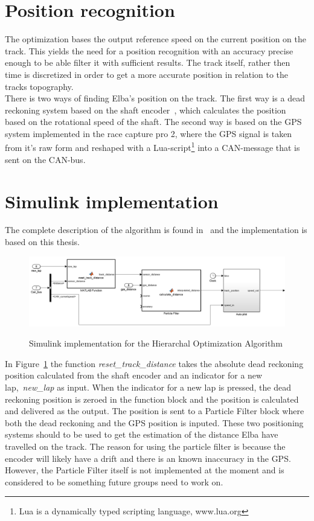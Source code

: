 \section{Position recognition}\label{sec:opt_pos_recon}
The optimization bases the output reference speed on the current position on the
track. This yields the need for a position recognition with an accuracy precise
enough to be able filter it with sufficient results. The track itself, rather
then time is discretized in order to get a more accurate position in relation to
the tracks topography. \\
There is two ways of finding Elba's position on the track. The first way is a dead
reckoning system based on the shaft encoder~\cite[p.~49]{elba2015},
which calculates the position based on the rotational speed of the shaft. The
second way is based on the GPS system implemented in the race capture pro 2,
where the GPS signal is taken from it's raw form and reshaped with a
Lua-script\footnote{Lua is a dynamically typed scripting language, www.lua.org}
into a CAN-message that is sent on the CAN-bus.

\section{Simulink implementation}
The complete description of the algorithm is found in~\cite{liu2016} and the
implementation is based on this thesis.
\begin{figure}[H]
    \centering\label{fig:optimization_cont}
    \includegraphics[width=\textwidth]{./img/optimization_cont.png}
    \caption{Simulink implementation for the Hierarchal Optimization Algorithm}
\end{figure}
In Figure~\ref{fig:optimization_cont} the function
\textit{reset\_track\_distance} takes the absolute dead reckoning position
calculated from the shaft encoder and an indicator for a new
lap,~\textit{new\_lap} as input. When the indicator for a new lap is pressed,
the dead reckoning position is zeroed in the function block and the position is
calculated and delivered as the output. The position is sent to a Particle
Filter block where both the dead reckoning and the GPS position is inputed.
These two positioning systems should to be used to get the estimation of the
distance Elba have travelled on the track. The reason for using the particle
filter is because the encoder will likely have a drift and there is an known
inaccuracy in the GPS\@. However, the Particle Filter itself is not implemented at
the moment and is considered to be something future groups need to work on.


